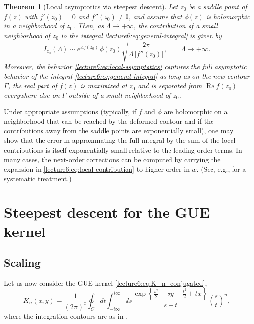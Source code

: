 \documentclass[letterpaper,11pt,oneside,reqno]{book}
\numberwithin{equation}{chapter}  %
\newcommand{\ssp}{\hspace{1pt}}
\newtheorem{theorem}[proposition]{Theorem}
\theoremstyle{definition}
\begin{document}
\begin{theorem}[Local asymptotics via steepest descent]
	\label{lecture6:thm:steepest-descent}
	Let $z_0$ be a saddle point of $f(z)$ with $f'(z_0)=0$ and $f''(z_0)\neq 0$, and assume that $\phi(z)$ is holomorphic in a neighborhood of $z_0$. Then, as $\Lambda\to+\infty$, the contribution of a small neighborhood of $z_0$ to the integral \eqref{lecture6:eq:general-integral} is given by
	\begin{equation}
		\label{lecture6:eq:local-asymptotics}
		I_{z_0}(\Lambda)
		\sim e^{\Lambda f(z_0)}\ssp \phi(z_0)
		\sqrt{\frac{2\pi}{\Lambda\,|f''(z_0)|}},\qquad \Lambda\to+\infty.
	\end{equation}
	Moreover, the behavior \eqref{lecture6:eq:local-asymptotics}
	captures the full asymptotic behavior of the
	integral \eqref{lecture6:eq:general-integral}
	as long as on the new contour $\Gamma$,
	the real part of $f(z)$ is maximized at $z_0$ and is separated
	from $\operatorname{Re}f(z_0)$ everywhere else on $\Gamma$ outside of a
	small neighborhood of $z_0$.
\end{theorem}

Under appropriate assumptions (typically, if $f$ and $\phi$ are holomorphic on a neighborhood that can be reached by the deformed contour and if the contributions away from the saddle points are exponentially small), one may show that the error in approximating the full integral by the sum of the local contributions is itself exponentially small relative to the leading order terms. In many cases, the next-order corrections can be computed by carrying the expansion in \eqref{lecture6:eq:local-contribution} to higher order in $w$. (See, e.g., \cite{olver1974asymptotics} for a systematic treatment.)



\section{Steepest descent for the GUE kernel}
\label{lecture6:sec:steepest-descent-GUE}

\subsection{Scaling}
\label{lecture6:sub:scaling}

Let us now consider the GUE kernel
\eqref{lecture6:eq:K_n_conjugated},
\begin{equation*}
	K_n(x,y)=\frac{1}{(2\pi)^2}
	\oint_C dt\int_{-i\infty}^{i\infty}ds\ssp
	\frac{\exp\left\{ \frac{s^2}{2}-sy-\frac{t^2}{2}+tx \right\}}{s-t}\left( \frac{s}{t} \right)^n
	,
\end{equation*}
where the integration contours are as in .
\end{document}
